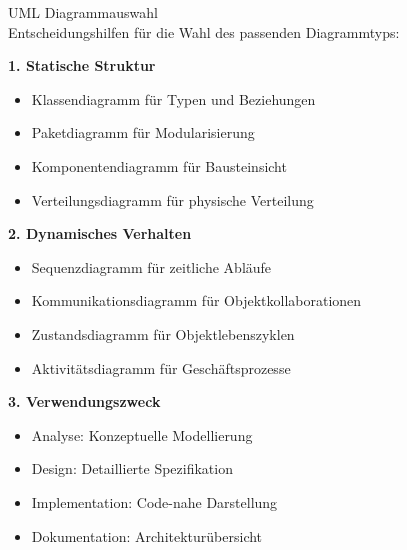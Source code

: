 \begin{KR}{UML Diagrammauswahl}\\
Entscheidungshilfen für die Wahl des passenden Diagrammtyps:

\textbf{1. Statische Struktur}
\begin{itemize}
    \item Klassendiagramm für Typen und Beziehungen
    \item Paketdiagramm für Modularisierung
    \item Komponentendiagramm für Bausteinsicht
    \item Verteilungsdiagramm für physische Verteilung
\end{itemize}

\textbf{2. Dynamisches Verhalten}
\begin{itemize}
    \item Sequenzdiagramm für zeitliche Abläufe
    \item Kommunikationsdiagramm für Objektkollaborationen
    \item Zustandsdiagramm für Objektlebenszyklen
    \item Aktivitätsdiagramm für Geschäftsprozesse
\end{itemize}

\textbf{3. Verwendungszweck}
\begin{itemize}
    \item Analyse: Konzeptuelle Modellierung
    \item Design: Detaillierte Spezifikation
    \item Implementation: Code-nahe Darstellung
    \item Dokumentation: Architekturübersicht
\end{itemize}
\end{KR}

